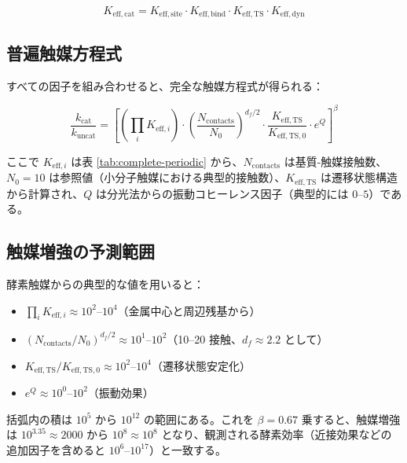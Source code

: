 \documentclass[11pt,a4paper]{article}
\newcommand{\df}{d_{\!f}}
\begin{document}
	\begin{equation}
		K_{\mathrm{eff},\text{cat}} = K_{\mathrm{eff},\text{site}} \cdot K_{\mathrm{eff},\text{bind}} \cdot K_{\mathrm{eff},\text{TS}} \cdot K_{\mathrm{eff},\text{dyn}}
		\label{eq:keff-cat}
	\end{equation}
	
	\subsection{普遍触媒方程式}
	
	すべての因子を組み合わせると、完全な触媒方程式が得られる：
	
	\begin{equation}
		\boxed{\frac{k_{\text{cat}}}{k_{\text{uncat}}} = \left[ \left(\prod_i K_{\mathrm{eff},i}\right) \cdot \left(\frac{N_{\text{contacts}}}{N_0}\right)^{\df/2} \cdot \frac{K_{\mathrm{eff},\text{TS}}}{K_{\mathrm{eff},\text{TS},0}} \cdot e^{Q} \right]^{\beta}}
		\label{eq:cat-universal}
	\end{equation}
	
	ここで $K_{\mathrm{eff},i}$ は表 \ref{tab:complete-periodic} から、$N_{\text{contacts}}$ は基質-触媒接触数、$N_0 = 10$ は参照値（小分子触媒における典型的接触数）、$K_{\mathrm{eff},\text{TS}}$ は遷移状態構造から計算され、$Q$ は分光法からの振動コヒーレンス因子（典型的には $0$--$5$）である。
	
	\subsection{触媒増強の予測範囲}
	
	酵素触媒からの典型的な値を用いると：
	\begin{itemize}
		\item $\prod_i K_{\mathrm{eff},i} \approx 10^2$--$10^4$（金属中心と周辺残基から）
		\item $(N_{\text{contacts}}/N_0)^{\df/2} \approx 10^1$--$10^2$（10--20 接触、$\df \approx 2.2$ として）
		\item $K_{\mathrm{eff},\text{TS}}/K_{\mathrm{eff},\text{TS},0} \approx 10^2$--$10^4$（遷移状態安定化）
		\item $e^{Q} \approx 10^0$--$10^2$（振動効果）
	\end{itemize}
	
	括弧内の積は $10^5$ から $10^{12}$ の範囲にある。これを $\beta = 0.67$ 乗すると、触媒増強は $10^{3.35} \approx 2000$ から $10^{8} \approx 10^8$ となり、観測される酵素効率（近接効果などの追加因子を含めると $10^6$--$10^{17}$）と一致する。
	
\end{document}
